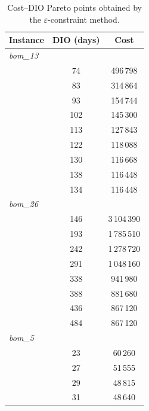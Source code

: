 \begin{table}[!htbp]\centering\small
\caption{Cost--DIO Pareto points obtained by the $\varepsilon$-constraint method.}\label{tab:paretodio}
\begin{tabular}{lcc}
\toprule
Instance & DIO (days) & Cost\\
\midrule
\multicolumn{3}{l}{\textit{bom\_13}} \\
 & 74 & 496\,798 \\
 & 83 & 314\,864 \\
 & 93 & 154\,744 \\
 & 102 & 145\,300 \\
 & 113 & 127\,843 \\
 & 122 & 118\,088 \\
 & 130 & 116\,668 \\
 & 138 & 116\,448 \\
 & 134 & 116\,448 \\
\midrule
\multicolumn{3}{l}{\textit{bom\_26}} \\
 & 146 & 3\,104\,390 \\
 & 193 & 1\,785\,510 \\
 & 242 & 1\,278\,720 \\
 & 291 & 1\,048\,160 \\
 & 338 & 941\,980 \\
 & 388 & 881\,680 \\
 & 436 & 867\,120 \\
 & 484 & 867\,120 \\
\midrule
\multicolumn{3}{l}{\textit{bom\_5}} \\
 & 23 & 60\,260 \\
 & 27 & 51\,555 \\
 & 29 & 48\,815 \\
 & 31 & 48\,640 \\
\bottomrule
\end{tabular}
\end{table}
